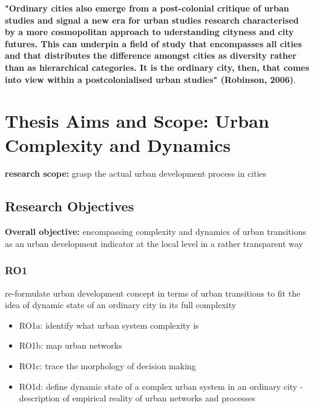 \documentclass[11pt]{report}
\begin{document}
\textbf{"Ordinary cities also emerge from a post-colonial critique of urban studies and signal a new era for urban studies research characterised by a more cosmopolitan approach to uderstanding cityness and city futures. This can underpin a field of study that encompasses all cities and that distributes the difference amongst cities as diversity rather than as hierarchical categories. It is the ordinary city, then, that comes into view within a postcolonialised urban studies" (Robinson, 2006)}.

\section{Thesis Aims and Scope: Urban Complexity and Dynamics}
\textbf{research scope:} grasp the actual urban development process in cities

\subsection{Research Objectives}
\textbf{Overall objective:} encompassing complexity and dynamics of urban transitions as an urban development indicator at the local level in a rather transparent way
\\

\subsubsection{RO1}
re-formulate urban development concept in terms of urban transitions to fit the idea of dynamic state of an ordinary city in its full complexity
\begin{itemize}
\item RO1a: identify what urban system complexity is  
\item RO1b: map  urban networks
\item RO1c: trace the morphology of decision making 
\item RO1d: define dynamic state of a complex urban system in an ordinary city - description of empirical reality of urban networks and processes
\end{itemize}
\end{document}

